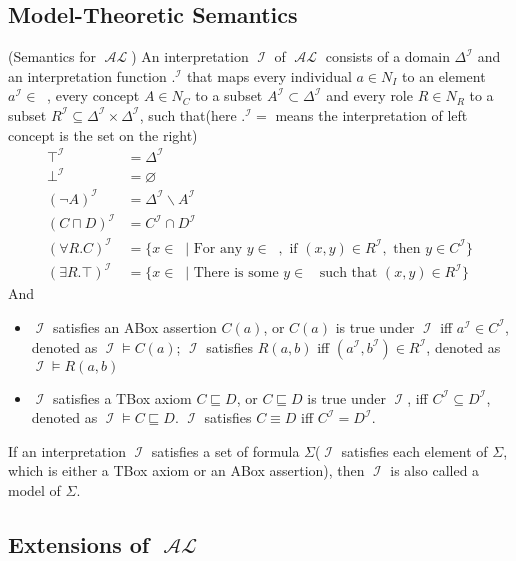 \documentclass{article}
\DeclareMathOperator{\al}{\mathcal{AL}}
\DeclareMathOperator{\deno}{\mathcal{I}}
\DeclareMathOperator{\dm}{\Delta^{\deno}}
\begin{document}
\subsection{Model-Theoretic Semantics}
\begin{defin}(Semantics for $\al$)\newline
An interpretation $\deno$ of $\al$ consists of a domain $\Delta^{\deno}$ and an interpretation function $.^{\deno}$ that maps every individual $a \in N_I$ to an element $a^{\deno} \in \dm$, every concept $A\in N_C$ to a subset $A^{\deno} \subset \Delta^{\deno}$ and every role $R\in N_R$ to a subset $R^{\deno}\subseteq\Delta^{\deno}\times\Delta^{\deno}$, such that(here $.^{\deno}=$ means the interpretation of left concept is the set on the right)
\begin{align*}
\top^{\deno} &= \Delta^{\deno}\\
\bot^{\deno} &= \varnothing\\
(\neg A)^{\deno} &= \Delta^{\deno}\backslash A^{\deno}\\
(C \sqcap D)^{\deno} &= C^{\deno} \cap D^{\deno}\\
(\forall R.C)^{\deno} &= \{ x\in \dm | \text{ For any }y\in \dm, \text{ if }(x,y) \in R^{\deno}, \text{ then } y\in C^{\deno}\}\\
(\exists R.\top)^{\deno} &= \{x \in \dm | \text{ There is some }y\in\dm \text{ such that }(x,y) \in R^{\deno}\}
\end{align*}
And 
\begin{itemize}
\item $\deno$ satisfies an ABox assertion $C(a)$, or $C(a)$ is true under $\deno$ iff $a^{\deno} \in C^{\deno}$, denoted as $\deno \vDash C(a)$; $\deno$ satisfies $R(a,b)$ iff $(a^{\deno},b^{\deno}) \in R^{\deno}$, denoted as $\deno \vDash R(a,b)$
\item $\deno$ satisfies a TBox axiom $C \sqsubseteq D$, or $C \sqsubseteq D$ is true under $\deno$, iff $C^{\deno} \subseteq D^{\deno}$, denoted as $\deno \vDash C \sqsubseteq D$.  $\deno$ satisfies $C \equiv D$ iff $C^{\deno} = D^{\deno}$.
\end{itemize}
If an interpretation $\deno$ satisfies a set of formula $\Sigma$($\deno$ satisfies each element of $\Sigma$, which is either a TBox axiom or an ABox assertion), then $\deno$ is also called a model of $\Sigma$.
\end{defin}

\subsection{Extensions of $\al$}
\end{document}
